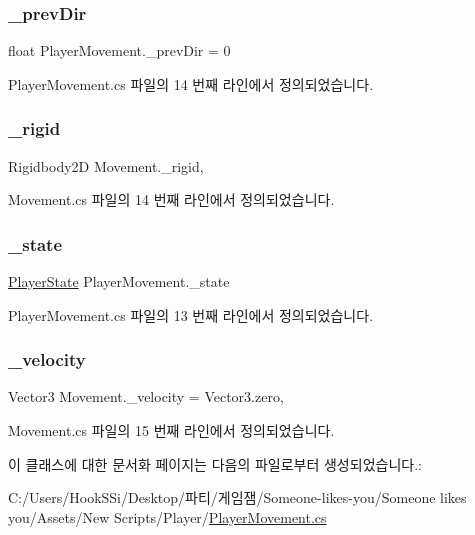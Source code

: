 \subsubsection{\texorpdfstring{\_prevDir}{\_prevDir}}
{\footnotesize\ttfamily float Player\+Movement.\+\_\+prev\+Dir = 0}



Player\+Movement.\+cs 파일의 14 번째 라인에서 정의되었습니다.

\mbox{\label{class_movement_a8b24a93b5f529e53c668ff81bde13c0d}} 
\subsubsection{\texorpdfstring{\_rigid}{\_rigid}}
{\footnotesize\ttfamily Rigidbody2D Movement.\+\_\+rigid\hspace{0.3cm}{\ttfamily [protected]}, {\ttfamily [inherited]}}



Movement.\+cs 파일의 14 번째 라인에서 정의되었습니다.

\mbox{\label{class_player_movement_af88a64a22da9ba3a831b0fe31bd8e7db}} 
\subsubsection{\texorpdfstring{\_state}{\_state}}
{\footnotesize\ttfamily \mbox{\hyperlink{class_player_state}{Player\+State}} Player\+Movement.\+\_\+state\hspace{0.3cm}{\ttfamily [protected]}}



Player\+Movement.\+cs 파일의 13 번째 라인에서 정의되었습니다.

\mbox{\label{class_movement_a6ea6768262f1dca968be8ee5c14a0cc1}} 
\subsubsection{\texorpdfstring{\_velocity}{\_velocity}}
{\footnotesize\ttfamily Vector3 Movement.\+\_\+velocity = Vector3.\+zero\hspace{0.3cm}{\ttfamily [protected]}, {\ttfamily [inherited]}}



Movement.\+cs 파일의 15 번째 라인에서 정의되었습니다.



이 클래스에 대한 문서화 페이지는 다음의 파일로부터 생성되었습니다.\+:\begin{DoxyCompactItemize}
\item 
C\+:/\+Users/\+Hook\+S\+Si/\+Desktop/파티/게임잼/\+Someone-\/likes-\/you/\+Someone likes you/\+Assets/\+New Scripts/\+Player/\mbox{\hyperlink{_player_movement_8cs}{Player\+Movement.\+cs}}\end{DoxyCompactItemize}
